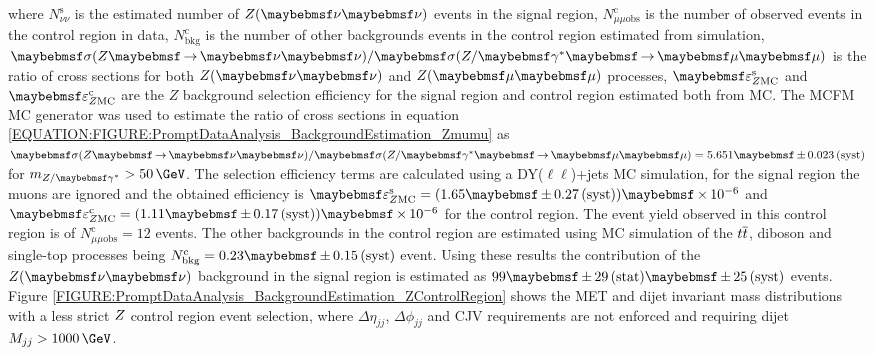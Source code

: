 
where $N^\mathrm{s}_{\nu\nu}$ is the estimated number of $\Z(\nu \nu)$ events in the signal region, $N^\mathrm{c}_{\mu\mu\text{obs}}$ is the number of observed events in the control region in data, $N^\mathrm{c}_\text{bkg}$ is the number of other backgrounds events in the control region estimated from simulation, $\sigma(\Z \to \nu \nu) / \sigma(\Z/\gamma^{*} \to \mu \mu)$ is the ratio of cross sections for both $\Z(\nu \nu)$ and $\Z (\mu \mu)$ processes, $\varepsilon^\mathrm{s}_{\Z \mathrm{MC}}$ and  $\varepsilon^\mathrm{c}_{\Z \mathrm{MC}}$ are the $Z$ background selection efficiency for the signal region and control region estimated both from \gls{MC}. The \textsc{MCFM} \gls{MC} generator \cite{ARTICLE:MCFMGenerator} was used to estimate the ratio of cross sections in equation \ref{EQUATION:FIGURE:PromptDataAnalysis_BackgroundEstimation_Zmumu} as $\sigma(\Z \to \nu \nu) / \sigma(\Z/\gamma^{*} \to \mu \mu) = 5.651 \pm 0.023\syst$ for $m_{\Z/\gamma^{*}} > 50\,\GeV$. The selection efficiency terms are calculated using a DY($\ell\ell$)+jets \gls{MC} simulation, for the signal region the muons are ignored and the obtained efficiency is $\varepsilon^\mathrm{s}_{\Z \mathrm{MC}} = (1.65 \pm 0.27\syst) \times 10^{-6}$ and $\varepsilon^\mathrm{c}_{\Z \mathrm{MC}}=(1.11 \pm 0.17\syst) \times 10^{-6}$ for the control region. The event yield observed in this control region is of $N^\mathrm{c}_{\mu\mu\text{obs}} = 12$ events. The other backgrounds in the control region are estimated using \gls{MC} simulation of the $t\overline{t}$, diboson and single-top processes being $N^\mathrm{c}_\text{bkg}=0.23 \pm 0.15\syst$ event. Using  these results the contribution of the  $\Z (\nu \nu)$ background in the signal region is estimated as $99 \pm 29\stat \pm 25\syst$ events. Figure \ref{FIGURE:PromptDataAnalysis_BackgroundEstimation_ZControlRegion} shows the \gls{MET} and dijet invariant mass distributions with a less strict $Z$ control region event selection, where $\Delta\eta_{jj}$, $\Delta\phi_{jj}$ and \gls{CJV} requirements are not enforced and requiring dijet $M_{jj}>1000\,\GeV$.


